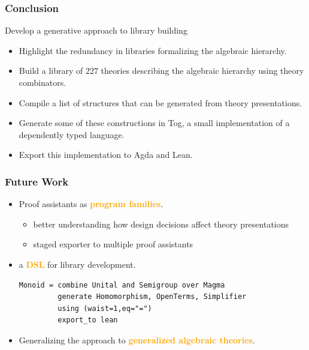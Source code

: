 \documentclass[t,10pt,numbers,fleqn,usenames,xcolor=dvipsnames]{beamer}
\begin{document}
\begin{frame}[fragile] 
\frametitle{Conclusion} 
Develop a generative approach to library building 
\begin{itemize}
\item Highlight the redundancy in libraries formalizing the algebraic hierarchy.
\item Build a library of $227$ theories describing the algebraic hierarchy using theory combinators.
\item Compile a list of structures that can be generated from theory presentations.
\item Generate some of these constructions in Tog, a small implementation of a dependently typed language.
\item Export this implementation to Agda and Lean.
\end{itemize}
\end{frame}

\begin{frame}[fragile] 
\frametitle{Future Work}
\begin{itemize}
\item Proof assistants as \textcolor{Orange}{\textbf{program families}}. 
\begin{itemize}
\item better understanding how design decisions affect theory presentations 
\item staged exporter to multiple proof assistants 
\end{itemize}
\pause
\vspace{0.5cm}
\item a \textcolor{Orange}{\textbf{DSL}} for library development. 
\vspace{0.2cm}
\begin{verbatim}
Monoid = combine Unital and Semigroup over Magma
         generate Homomorphism, OpenTerms, Simplifier
         using (waist=1,eq="=")
         export_to lean
\end{verbatim}
\pause 
\vspace{0.5cm}
\item Generalizing the approach to \textcolor{Orange}{\textbf{generalized algebraic theories}}.
\end{itemize}
\end{frame} 

\end{document}

